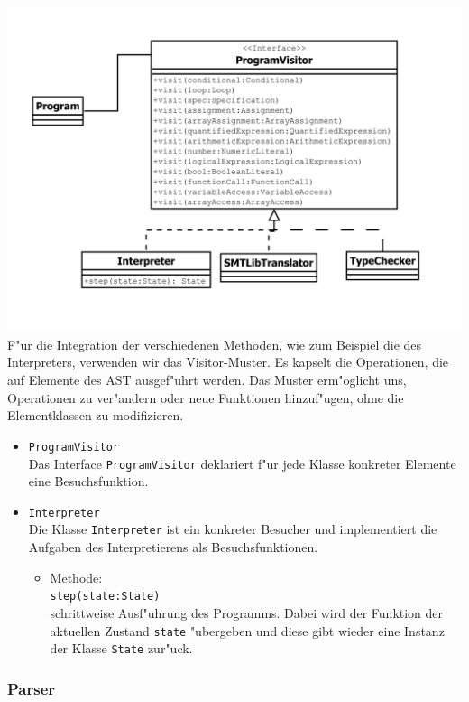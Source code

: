\documentclass[10pt,a4paper,titlepage]{article}
\begin{document}
\includegraphics[scale=0.7]{images/Besucher.pdf} \\
F"ur die Integration der verschiedenen Methoden, wie zum Beispiel die des Interpreters, verwenden wir das Visitor-Muster. Es kapselt die Operationen, die auf Elemente des AST ausgef"uhrt werden. Das Muster erm"oglicht uns, Operationen zu ver"andern oder neue Funktionen hinzuf"ugen, ohne die Elementklassen zu modifizieren. 
\begin{itemize}
\item \texttt{ProgramVisitor} \\
Das Interface \texttt{ProgramVisitor} deklariert f"ur jede Klasse konkreter Elemente eine Besuchsfunktion.
\item \texttt{Interpreter} \\
Die Klasse \texttt{Interpreter} ist ein konkreter Besucher und implementiert die Aufgaben des Interpretierens als Besuchsfunktionen. 
\begin{itemize}
\item Methode: \\
\texttt{step(state:State)} \\
schrittweise Ausf"uhrung des Programms. Dabei wird der Funktion der aktuellen Zustand \texttt{state} "ubergeben und diese gibt wieder eine Instanz der Klasse \texttt{State} zur"uck. \\
\end{itemize}
\end{itemize}

\subsubsection{Parser}
\end{document}
